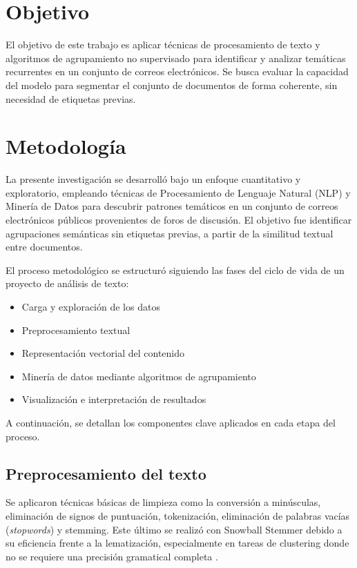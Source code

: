 \documentclass[journal]{IEEEtran} %
\begin{document}
\section{Objetivo}
El objetivo de este trabajo es aplicar técnicas de procesamiento de texto y algoritmos de agrupamiento no supervisado para identificar y analizar temáticas recurrentes en un conjunto de correos electrónicos. Se busca evaluar la capacidad del modelo para segmentar el conjunto de documentos de forma coherente, sin necesidad de etiquetas previas.

\section{Metodología}

La presente investigación se desarrolló bajo un enfoque cuantitativo y exploratorio, empleando técnicas de Procesamiento de Lenguaje Natural (NLP) y Minería de Datos para descubrir patrones temáticos en un conjunto de correos electrónicos públicos provenientes de foros de discusión. El objetivo fue identificar agrupaciones semánticas sin etiquetas previas, a partir de la similitud textual entre documentos.

El proceso metodológico se estructuró siguiendo las fases del ciclo de vida de un proyecto de análisis de texto:

\begin{itemize}
    \item Carga y exploración de los datos
    \item Preprocesamiento textual
    \item Representación vectorial del contenido
    \item Minería de datos mediante algoritmos de agrupamiento
    \item Visualización e interpretación de resultados
\end{itemize}

A continuación, se detallan los componentes clave aplicados en cada etapa del proceso.

\subsection{Preprocesamiento del texto}
Se aplicaron técnicas básicas de limpieza como la conversión a minúsculas, eliminación de signos de puntuación, tokenización, eliminación de palabras vacías (\textit{stopwords}) y stemming. Este último se realizó con Snowball Stemmer debido a su eficiencia frente a la lematización, especialmente en tareas de clustering donde no se requiere una precisión gramatical completa \cite{manning2008introduction}.
\end{document}
